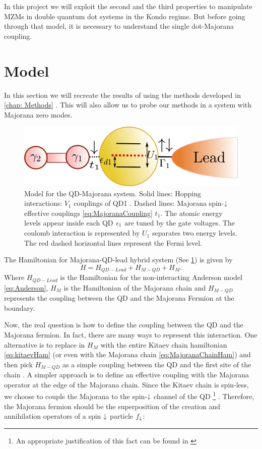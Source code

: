 In this project we will exploit the second and the third properties to manipulate MZMs in double quantum dot systems in the Kondo regime. But before going through that model, it is necessary to understand the single dot-Majorana coupling.

\section{Model}

In this section we will recreate the results of \citeauthor{liu_detecting_2011} using the methods developed in \ref{chap: Methods} . This will also allow us to probe our methods in a system with Majorana zero modes. 

\begin{figure}[t]
\centering
\includegraphics[scale=0.6]{IMAGES/Majorana/QD-M.png}
\caption{\label{fig:ModelM-QD} Model for the QD-Majorana system. Solid lines: Hopping interactions: $V_1$ couplings of QD1 . Dashed lines: Majorana spin-$\downarrow$ effective couplings \eqref{eq:MajoranaCoupling} $t_1$. The atomic energy levels appear inside each QD $\epsilon_1$ are tuned by the gate voltages. The coulomb interaction is represented by $U_1$ separates two energy levels.  The red dashed horizontal lines represent the Fermi level. }
\end{figure}

The Hamiltonian for Majorana-QD-lead hybrid system (See \ref{fig:ModelM-QD}) is  given by
\begin{equation}
    H=H_{QD-Lead}+H_{M-QD}+H_M.
\end{equation}
Where $H_{QD-Lead}$ is the Hamiltonian for the non-interacting Anderson model \eqref{eq:Anderson}, $H_M$ is the Hamiltonian of the Majorana chain and $H_{M-QD}$ represents the coupling between the QD and the Majorana Fermion at the boundary.

Now, the real question is how to define the coupling between the QD and the Majorana fermion. In fact, there are many ways to represent this interaction. One alternative is to replace in $H_{M}$ with the entire Kitaev chain hamiltonian \eqref{eq:kitaevHam} (or  even with the  Majorana chain \eqref{eq:MajoranaChainHam}) and then pick $H_{M-QD}$ as a simple coupling between the QD and the first site of the chain \cite{vernek_subtle_2014}.  A simpler approach is  to define an effective coupling with the Majorana operator at the edge of the Majorana chain. Since the Kitaev chain is spin-less, we choose to couple the Majorana to the spin-$\downarrow$ channel of the QD \footnote{An appropriate justification of this fact can be found in \cite{ruiz-tijerina_interaction_2015}} . Therefore, the Majorana fermion should be the superposition of the creation and annihilation operators of a spin $\downarrow$ particle $f_\downarrow$:

